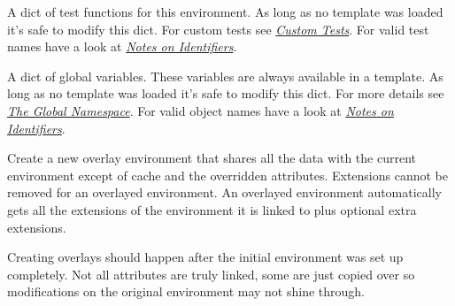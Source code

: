 \documentclass[a4paper,10pt,english]{sphinxmanual}
\begin{document}
\begin{fulllineitems}
\begin{fulllineitems}
\label{api:jinja2.Environment.tests}
A dict of test functions for this environment.  As long as no
template was loaded it's safe to modify this dict.  For custom tests
see {\hyperref[api:writing-tests]{\emph{Custom Tests}}}.  For valid test names have a look at
{\hyperref[api:identifier-naming]{\emph{Notes on Identifiers}}}.

\end{fulllineitems}


\begin{fulllineitems}
\label{api:jinja2.Environment.globals}
A dict of global variables.  These variables are always available
in a template.  As long as no template was loaded it's safe
to modify this dict.  For more details see {\hyperref[api:global-namespace]{\emph{The Global Namespace}}}.
For valid object names have a look at {\hyperref[api:identifier-naming]{\emph{Notes on Identifiers}}}.

\end{fulllineitems}


\begin{fulllineitems}
\label{api:jinja2.Environment.overlay}
Create a new overlay environment that shares all the data with the
current environment except of cache and the overridden attributes.
Extensions cannot be removed for an overlayed environment.  An overlayed
environment automatically gets all the extensions of the environment it
is linked to plus optional extra extensions.

Creating overlays should happen after the initial environment was set
up completely.  Not all attributes are truly linked, some are just
copied over so modifications on the original environment may not shine
through.

\end{fulllineitems}



\end{fulllineitems}
\end{document}
